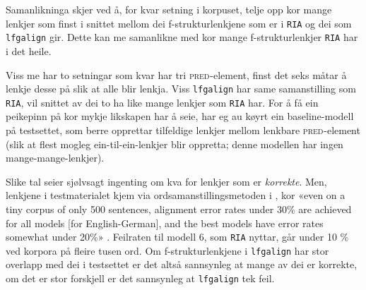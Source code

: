 \documentclass[11pt,a4paper,oneside,draft]{report}
\newcommand{\F}[2]{\textsc{#1}\ensuremath{_{#2}}}
\newcommand{\PRED}{\F{pred}{}}
\begin{document}
Samanlikninga skjer ved å, for kvar setning i korpuset, telje opp kor
mange lenkjer som finst i snittet mellom dei f-strukturlenkjene som er
i \texttt{RIA} og dei som \texttt{lfgalign} gir. Dette kan me samanlikne med kor
mange f-strukturlenkjer \texttt{RIA} har i det heile.

Viss me har to setningar som kvar har tri \PRED{}-element, finst det
seks måtar å lenkje desse på slik at alle blir lenkja. Viss \texttt{lfgalign}
har same samanstilling som \texttt{RIA}, vil snittet av dei to ha like mange
lenkjer som \texttt{RIA} har. For å få ein peikepinn på kor mykje likskapen
har å seie, har eg au køyrt ein baseline-modell på testsettet, som
berre opprettar tilfeldige lenkjer mellom lenkbare \PRED{}-element
(slik at flest mogleg ein-til-ein-lenkjer blir oppretta; denne
modellen har ingen mange-mange-lenkjer).

 Slike tal seier sjølvsagt ingenting om kva for lenkjer som er
 \emph{korrekte}. Men, lenkjene i testmaterialet kjem via
 ordsamanstillingsmetoden i \citet{och2003scv}, kor «even on a tiny
 corpus of only 500 sentences, alignment error rates under 30\% are
 achieved for all models [for English-German], and the best models
 have error rates somewhat under 20\%»
 \citep[s.~36]{och2003scv}. Feilraten til modell 6, som \texttt{RIA} nyttar,
 går under 10 \% ved korpora på fleire tusen ord. Om f-strukturlenkjene
 i \texttt{lfgalign} har stor overlapp med dei i testsettet er det altså
 sannsynleg at mange av dei er korrekte, om det er stor forskjell er
 det sannsynleg at \texttt{lfgalign} tek feil.
\end{document}
